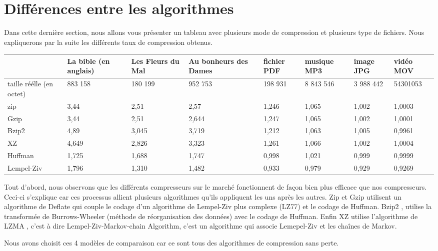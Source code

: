 \documentclass{report}
\begin{document}
\section*{Différences entre les algorithmes}
Dans cette dernière section, nous allons vous présenter un tableau avec plusieurs mode de compression et plusieurs type de fichiers. 
Nous expliquerons par la suite les différents taux de compression obtenus. 


\begin{flushleft}
{\renewcommand{\arraystretch}{2}
\begin{tabular}{|p{1.5cm}|p{1.5cm}|p{1.5cm}|p{1.5cm}|p{1.5cm}|p{1.5cm}|p{1.5cm}|p{1.5cm}|}
\hline
 & La bible (en anglais)  & Les Fleurs du Mal  & Au bonheurs des Dames & fichier PDF & musique  MP3 & image JPG & vidéo MOV\\
\hline
taille réélle (en octet)  & 883 158 & 180 199 & 952 753 & 198 931 & 8 843 546 & 3 988 442 & 54301053 \\\hline
zip & 3,44 & 2,51 & 2,57 & 1,246 & 1,065 & 1,002 & 1,0003 \\
\hline
Gzip & 3,44 & 2,51 & 2,644 & 1,247 & 1,065 & 1,002 & 1,0001 \\
\hline
Bzip2 & 4,89 & 3,045 & 3,719 & 1,212 & 1,063 & 1,005 & 0,9961\\
\hline
XZ & 4,649 & 2,826 & 3,323 & 1,261 & 1,066 & 1,002 & 1,0004\\
\hline
Huffman & 1,725 & 1,688 & 1,747 & 0,998 & 1,021 & 0,999 & 0,9999 \\
\hline
Lempel-Ziv & 1,796 & 1,310 & 1,482 & 0,933 & 0,979 & 0,929 & 0,9269\\
\hline

\end{tabular}
}
\end{flushleft}

Tout d'abord, nous observons que les différents compresseurs sur le marché fonctionnent de façon bien plus efficace que nos compresseurs. Ceci-ci s'explique car ces processus allient plusieurs algorithmes qu'ils appliquent les uns après les autres. Zip et Gzip utilisent un algorithme de Deflate qui couple le codage d'un algorithme de Lempel-Ziv plus complexe (LZ77) et le codage de Huffman. Bzip2 , utilise  la transformée de Burrows-Wheeler (méthode de réorganisation des données) avec le codage de Huffman. Enfin XZ utilise l'algorithme de LZMA , c'est à dire Lempel-Ziv-Markov-chain Algorithm, c'est un algorithme qui associe Lemepel-Ziv et les chaînes de Markov.

Nous avons choisit ces 4 modèles de comparaison car ce sont tous des algorithmes de compression sans perte. 
\end{document}
